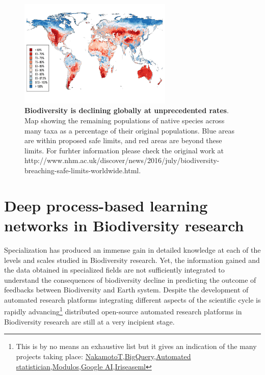 \documentclass[authoryear,1p,12pt]{elsarticle}
\begin{document}
\newpage

\begin{figure}
  \begin{center}
       \includegraphics[width=0.65\textwidth]{Figure1}
     \end{center}
     \vspace{-0.7 in}
     \caption{{\bf Biodiversity is declining globally at unprecedented
         rates}. Map showing the remaining populations of native
       species across many taxa as a percentage of their original
       populations. Blue areas are within proposed safe limits, and
       red areas are beyond these limits. For furhter information
       please check the original work at
       {http://www.nhm.ac.uk/discover/news/2016/july/biodiversity-breaching-safe-limits-worldwide.html}.}
\end{figure}


\pagebreak
\section{{\bf Deep process-based learning networks in Biodiversity research}}

\noindent Specialization has produced an immense gain in detailed
knowledge at each of the levels and scales studied in Biodiversity
research. Yet, the information gained and the data obtained in
specialized fields are not sufficiently integrated to understand the
consequences of biodiversity decline in predicting the outcome of
feedbacks between Biodiversity and Earth system. Despite the
development of automated research platforms integrating different
aspects of the scientific cycle is rapidly advancing\footnote{This is
  by no means an exhaustive list but it gives an indication of the
  many projects taking place:
  \href{https://www.nterminal.com}{NakamotoT},\href{https://cloud.google.com/bigquery/}{BigQuery},\href{https://www.automaticstatistician.com/index/}{Automated
    statistician},\href{http://www.modulos.ai/}{Modulos},\href{https://ai.google/}{Google
    AI},\href{https://iris.ai}{Iris}\href{https://github.com/DS3Lab/easeml}{easeml}}
distributed open-source automated research platforms in Biodiversity
research are still at a very incipient stage.
\end{document}
